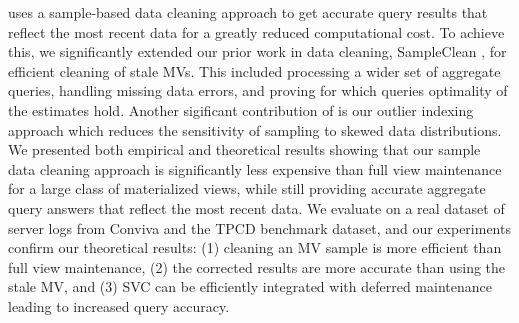 \svc uses a sample-based data cleaning approach to get accurate query results that reflect the most recent data for a greatly reduced computational cost.
To achieve this, we significantly extended our prior work in data cleaning, SampleClean \cite{wang1999sample}, for efficient cleaning of stale MVs. 
This included processing a wider set of aggregate queries, handling missing data errors, and proving for which queries optimality of the estimates hold.
Another sigificant contribution of \svc is our outlier indexing approach which reduces the sensitivity of sampling to skewed data distributions.
We presented both empirical and theoretical results showing that our sample data cleaning approach is significantly less expensive than full view maintenance for a large class of materialized views, while still providing accurate aggregate query answers that reflect the most recent data.
We evaluate \svc on a real dataset of server logs from Conviva and the TPCD benchmark dataset, and our experiments confirm our theoretical results: (1) cleaning an MV sample is more efficient than full view maintenance, (2) the corrected results are more accurate than using the stale MV, and (3) SVC can be efficiently integrated with deferred maintenance leading to increased query accuracy. 





